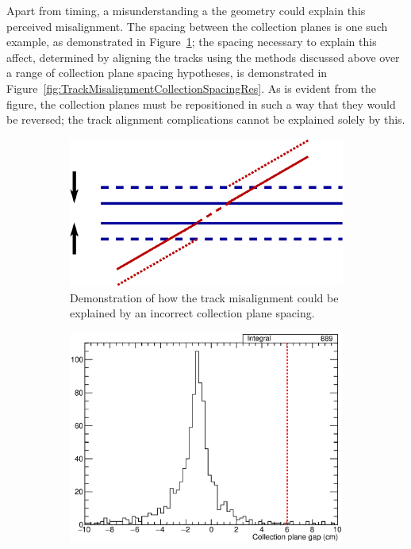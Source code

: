 Apart from timing, a misunderstanding a the geometry could explain this perceived misalignment.  The spacing between the collection planes is one such example, as demonstrated in Figure~\ref{fig:TrackMisalignmentCollectionSpacingGeo}; the spacing necessary to explain this affect, determined by aligning the tracks using the methods discussed above over a range of collection plane spacing hypotheses, is demonstrated in Figure~\ref{fig:TrackMisalignmentCollectionSpacingRes}.  As is evident from the figure, the collection planes must be repositioned in such a way that they would be reversed; the track alignment complications cannot be explained solely by this.

\begin{figure}
  \centering
  \begin{subfigure}[t]{0.48\linewidth}
    \centering
    \includegraphics[width=\textwidth]{misalign_track_collection_geo.eps}
    \caption{Demonstration of how the track misalignment could be explained by an incorrect collection plane spacing.}
    \label{fig:TrackMisalignmentCollectionSpacingGeo}
  \end{subfigure}
  \hfill
  \begin{subfigure}[t]{0.48\linewidth}
    \centering
    \includegraphics[width=\textwidth]{misalign_track_collection_res.eps}

\end{subfigure}
\end{figure}
